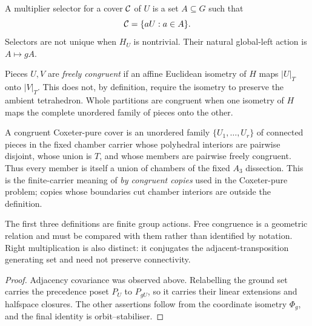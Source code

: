 \begin{definition}[Selector]
A multiplier selector for a cover $\mathcal C$ of $U$ is a set $A\subseteq G$ such
that
\[
 \mathcal C=\{aU:a\in A\}.
\]
Selectors are not unique when $H_U$ is nontrivial.  Their natural global-left
action is $A\mapsto gA$.
\end{definition}

\begin{definition}
Pieces $U,V$ are \emph{freely congruent} if an affine Euclidean isometry of
$H$ maps $|U|_T$ onto $|V|_T$.  This does not, by definition, require the
isometry to preserve the ambient tetrahedron.  Whole partitions are
congruent when one isometry of $H$ maps the complete unordered family of
pieces onto the other.
\end{definition}

\begin{definition}
A congruent Coxeter-pure cover is an unordered family
$\{U_1,\ldots,U_r\}$ of connected pieces in the fixed chamber carrier whose
polyhedral interiors are pairwise disjoint, whose union is $T$, and whose
members are pairwise freely congruent.  Thus every member is itself a union
of chambers of the fixed $A_3$ dissection.  This is the finite-carrier
meaning of \emph{by congruent copies} used in the Coxeter-pure problem;
copies whose boundaries cut chamber interiors are outside the definition.
\end{definition}

The first three definitions are finite group actions.  Free congruence is a
geometric relation and must be compared with them rather than identified by
notation.  Right multiplication is also distinct: it conjugates the
adjacent-transposition generating set and need not preserve connectivity.

\begin{proof}
Adjacency covariance was observed above.  Relabelling the ground set carries
the precedence poset $P_U$ to $P_{gU}$, so it carries their linear extensions
and halfspace closures.  The other assertions follow from the coordinate
isometry $\Phi_g$, and the final identity is orbit--stabiliser.
\end{proof}
